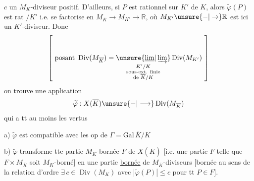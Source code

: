 $c$ un $M_K$-diviseur positif. D'ailleurs,  si $P$ est rationnel sur  $K'$ de $K$, alors $\widetilde{\varphi}(P)$ est rat $/K'$ i.e. se factorise en $M_{\overline K}\longrightarrow M_{K'}\longrightarrow\mathbb R$, où $M_{K'}\unsure{-|\to}\mathbb R$ est ici un $K'$-diviseur. Donc
\[
\left[\ \text{posant }\operatorname{Div}(M_{\overline K})=
\underset{\substack{K'/K\\\text{sous-ext. finie}\\\text{de }\overline K/K}}{\unsure{\underline{\lim}|\varinjlim}}
\operatorname{Div}(M_{K'})\ \right]
\]
on trouve une application
\[
\widetilde{\varphi}:X(\overline K)\unsure{-|\longrightarrow}\operatorname{Div}(M_{\overline K})
\]
qui a tt au moins les vertus 

a) $\widetilde{\varphi}$ est compatible avec les op de $\Gamma=\mathrm{Gal}\,\overline K/K$

b) $\widetilde{\varphi}$ transforme tte partie $M_K$-bornée $F$ de $X(\overline K)$ [i.e. une partie $F$ telle que $F\times M_{\overline K}$ soit $M_K$-borné] en une partie \uline{bornée} de $M_{\overline K}$-diviseurs [bornée au sens de la relation d'ordre  $\exists\,c\in\operatorname{Div}(M_K)$ avec $|\widetilde{\varphi}(P)|\leq c$ pour tt $P\in F$].
